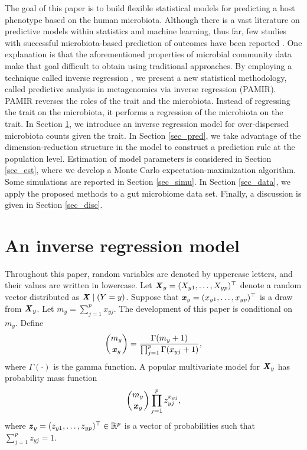 \documentclass[12pt]{article}
\def \bfitx{\mbox{\textbf{\textit{x}}}}
\def \bfitz{\mbox{\textbf{\textit{z}}}}
\def \bfitX{\mbox{\textbf{\textit{X}}}}
\begin{document}
The goal of this paper is to build flexible statistical models for predicting a host phenotype based on the human microbiota. Although there is a vast literature on predictive models within statistics and machine learning, thus far, few studies with successful microbiota-based prediction of outcomes have been reported \citep{gevers2014treatment, teng2015prediction}. One explanation is that the aforementioned properties of microbial community data make that goal difficult to obtain using traditional approaches. By employing a technique called inverse regression \citep{li1991sliced}, we present a new statistical methodology, called predictive analysis in metagenomics via inverse regression (PAMIR). PAMIR reverses the roles of the trait and the microbiota. Instead of regressing the trait on the microbiota, it performs a regression of the microbiota on the trait. In Section \ref{sec_mod}, we introduce an inverse regression model for over-dispersed microbiota counts given the trait. In Section \ref{sec_pred}, we take advantage of the dimension-reduction structure in the model to construct a prediction rule at the population level. Estimation of model parameters is considered in Section \ref{sec_est}, where we develop a Monte Carlo expectation-maximization algorithm. Some simulations are reported in Section \ref{sec_simu}. In Section \ref{sec_data}, we apply the proposed methods to a gut microbiome data set. Finally, a discussion is given in Section \ref{sec_disc}.

\section{An inverse regression model}\label{sec_mod}

Throughout this paper, random variables are denoted by uppercase letters, and their values are written in lowercase. Let $\bfitX_y = (X_{y1}, \ldots, X_{yp})^{\top}$ denote a random vector distributed as $\bfitX \mid (Y = y)$. Suppose that $\bfitx_y = (x_{y1}, \ldots, x_{yp})^{\top}$ is a draw from $\bfitX_y$. Let $m_y = \sum_{j = 1}^p x_{yj}$. The development of this paper is conditional on $m_y$. Define
$$\binom{m_y}{\bfitx_y} = \frac{\Gamma(m_y + 1)}{\prod_{j = 1}^p \Gamma(x_{yj} + 1)},$$
where $\Gamma(\cdot)$ is the gamma function. A popular multivariate model for $\bfitX_y$ has probability mass function
\begin{eqnarray}\label{multinomial}
\binom{m_y}{\bfitx_y} \prod_{j = 1}^p z_{yj}^{x_{yj}},
\end{eqnarray}
where $\bfitz_y = (z_{y1}, \ldots, z_{yp})^{\top} \in \mathbb{R}^p$ is a vector of probabilities such that $\sum_{j = 1}^p z_{yj} = 1$.
\end{document}
